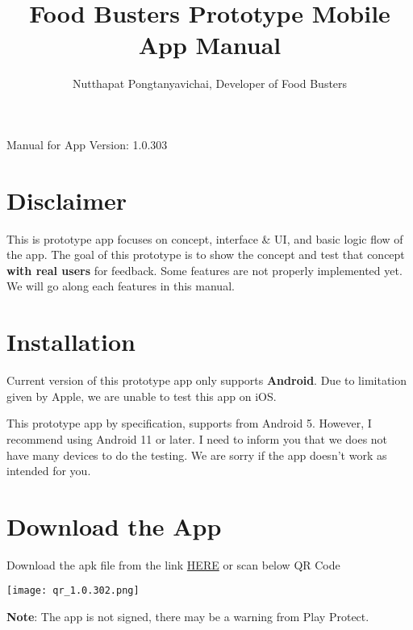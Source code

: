 \documentclass[a4paper,12pt]{article}
\begin{document}
\title{\textbf{Food Busters Prototype Mobile App Manual}}

\author{Nutthapat Pongtanyavichai, Developer of Food Busters}

\maketitle

\centerline{\Large{Manual for App Version: 1.0.303}}

\tableofcontents

\pagebreak

\section{Disclaimer}

This is prototype app focuses on concept, interface \& UI, and basic logic flow of the app.
The goal of this prototype is to show the concept and test that concept \textbf{with real users}
for feedback. Some features are not properly implemented yet.
We will go along each features in this manual.

\section{Installation}

Current version of this prototype app only supports \textbf{Android}. Due to
limitation given by Apple, we are unable to test this app on iOS.

This prototype app by specification, supports from Android 5.
However, I recommend using Android 11 or later.
I need to inform you that we does not have many devices to do the testing.
We are sorry if the app doesn't work as intended for you.

\section*{Download the App}

\noindent
\begin{simplechar}
    Download the apk file from the link \href{https://github.com/Food-Busters/food_busters/releases/download/1.0.303/food_busters-1.0.303.apk}{HERE} or scan below QR Code
\end{simplechar}

\centerline{\texttt{[image: qr\_1.0.302.png]}}

\noindent
\textbf{Note}: The app is not signed, there may be a warning from Play Protect.
\end{document}
